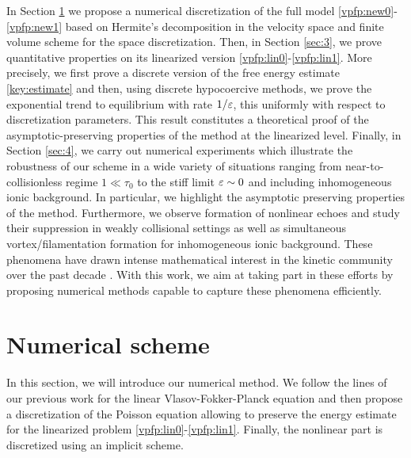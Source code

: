 \documentclass[11pt]{amsart}
\numberwithin{equation}{section}
\numberwithin{figure}{section}
\begin{document}
In Section \ref{sec:2} we propose a numerical discretization of the
full model \eqref{vpfp:new0}-\eqref{vpfp:new1} based on Hermite's
decomposition in the velocity space and finite volume scheme for the
space discretization. Then, in Section \ref{sec:3}, we prove
quantitative properties on its linearized version
\eqref{vpfp:lin0}-\eqref{vpfp:lin1}. More precisely, we first prove
a discrete version of the free energy estimate \eqref{key:estimate}
and then, using discrete hypocoercive methods, we prove the exponential
trend to equilibrium with rate $1/\varepsilon$, this uniformly with respect to discretization parameters. This result constitutes a theoretical proof of the asymptotic-preserving properties of the method at the linearized level. Finally, in Section
\ref{sec:4}, we carry out numerical experiments which illustrate the
robustness of our scheme in a wide variety of situations ranging from
near-to-collisionless regime $1\ll \tau_0$ to the stiff limit
$\varepsilon\sim 0$ and including inhomogeneous ionic background.  In particular, we highlight the asymptotic preserving properties of the method. Furthermore, we observe formation of nonlinear echoes and study their suppression in weakly collisional settings as well as simultaneous vortex/filamentation formation for inhomogeneous ionic background. These phenomena have drawn intense mathematical interest in the kinetic community over the past decade \cite{Bedrossian17,Grenier_Toan_Rodnianski22,Chaturvedi_Luk_Nguyen23}. With this work, we aim at taking part in these efforts by proposing numerical methods capable to capture these phenomena efficiently. 


\section{Numerical scheme}
\label{sec:2}
\setcounter{equation}{0}
\setcounter{figure}{0}
\setcounter{table}{0} 
In this section, we will introduce our numerical method. We follow the lines of our previous work for the linear
Vlasov-Fokker-Planck equation \cite{BF_09_22} and then propose a
discretization of the Poisson equation allowing to preserve the
energy estimate for the linearized problem
\eqref{vpfp:lin0}-\eqref{vpfp:lin1}. Finally, the nonlinear part is
discretized using an implicit scheme.
\end{document}
